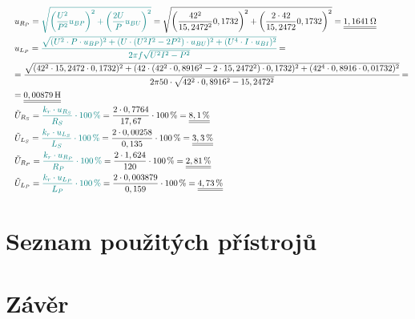 \documentclass[a4paper, czech]{article}
\begin{document}
\begin{enumerate}
\begin{multline*}
        \ \ \ u_{R_P} = \textcolor{teal}{\sqrt{\left(\frac{U^2}{P^2}u_{BP}\right)^2 + \left(\frac{2U}{P}u_{BU}\right)^2}} = \sqrt{\left(\frac{42^2}{15,2472^2}0,1732\right)^2 + \left(\frac{2 \cdot 42}{15,2472}0,1732\right)^2} = \underline{\underline{1,1641\,\Omega}} \hfill \\
        \ \ \ u_{L_P} = \textcolor{teal}{\cfrac{\sqrt{(U^2 \cdot P \cdot u_{BP})^2 + (U \cdot (U^2I^2 - 2P^2) \cdot u_{BU})^2 + (U^4\cdot I \cdot u_{BI})^2}}{2 \pi f \sqrt{U^2I^2-P^2}}} = \hfill \\
        \ \ \ = \cfrac{\sqrt{(42^2 \cdot 15,2472 \cdot 0,1732)^2 + (42 \cdot (42^2 \cdot 0,8916^2 - 2 \cdot 15,2472^2) \cdot 0,1732)^2 + (42^4\cdot 0,8916 \cdot 0,01732)^2}}{2 \pi 50 \cdot \sqrt{42^2 \cdot 0,8916^2-15,2472^2}} = \hfill \\
        \ \ \ = \underline{\underline{0,00879\,\text{H}}} \hfill \\
        \ \ \ \tilde{U}_{R_S} = \textcolor{teal}{\frac{k_r \cdot u_{R_S}}{R_S} \cdot 100\,\%} = \frac{2 \cdot 0,7764}{17,67} \cdot 100\,\% = \underline{\underline{8,1\,\%}} \hfill \\
        \ \ \ \tilde{U}_{L_S} = \textcolor{teal}{\frac{k_r \cdot u_{L_S}}{L_S} \cdot 100\,\%} = \frac{2 \cdot 0,00258}{0,135} \cdot 100\,\% = \underline{\underline{3,3\,\%}} \hfill \\
        \ \ \ \tilde{U}_{R_P} = \textcolor{teal}{\frac{k_r \cdot u_{R_P}}{R_P} \cdot 100\,\%} = \frac{2 \cdot 1,624}{120} \cdot 100\,\% = \underline{\underline{2,81\,\%}} \hfill \\
        \ \ \ \tilde{U}_{L_P} = \textcolor{teal}{\frac{k_r \cdot u_{L_P}}{L_P} \cdot 100\,\%} = \frac{2 \cdot 0,003879}{0,159} \cdot 100\,\% = \underline{\underline{4,73\,\%}} \hfill \\
    \end{multline*}
\end{enumerate}

\section{Seznam použitých přístrojů}

\section{Závěr}
\end{document}
